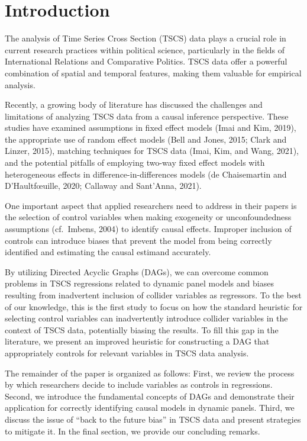 \documentclass[
  super,
  preprint,
  3p]{elsarticle}
\begin{document}
\hypertarget{introduction}{%
\section{Introduction}\label{introduction}}

The analysis of Time Series Cross Section (TSCS) data plays a crucial
role in current research practices within political science,
particularly in the fields of International Relations and Comparative
Politics. TSCS data offer a powerful combination of spatial and temporal
features, making them valuable for empirical analysis.

Recently, a growing body of literature has discussed the challenges and
limitations of analyzing TSCS data from a causal inference perspective.
These studies have examined assumptions in fixed effect models (Imai and
Kim, 2019), the appropriate use of random effect models (Bell and Jones,
2015; Clark and Linzer, 2015), matching techniques for TSCS data (Imai,
Kim, and Wang, 2021), and the potential pitfalls of employing two-way
fixed effect models with heterogeneous effects in
difference-in-differences models (de Chaisemartin and D'Haultfœuille,
2020; Callaway and Sant'Anna, 2021).

One important aspect that applied researchers need to address in their
papers is the selection of control variables when making exogeneity or
unconfoundedness assumptions (cf.~Imbens, 2004) to identify causal
effects. Improper inclusion of controls can introduce biases that
prevent the model from being correctly identified and estimating the
causal estimand accurately.

By utilizing Directed Acyclic Graphs (DAGs), we can overcome common
problems in TSCS regressions related to dynamic panel models and biases
resulting from inadvertent inclusion of collider variables as
regressors. To the best of our knowledge, this is the first study to
focus on how the standard heuristic for selecting control variables can
inadvertently introduce collider variables in the context of TSCS data,
potentially biasing the results. To fill this gap in the literature, we
present an improved heuristic for constructing a DAG that appropriately
controls for relevant variables in TSCS data analysis.

The remainder of the paper is organized as follows: First, we review the
process by which researchers decide to include variables as controls in
regressions. Second, we introduce the fundamental concepts of DAGs and
demonstrate their application for correctly identifying causal models in
dynamic panels. Third, we discuss the issue of ``back to the future
bias'' in TSCS data and present strategies to mitigate it. In the final
section, we provide our concluding remarks.
\end{document}
